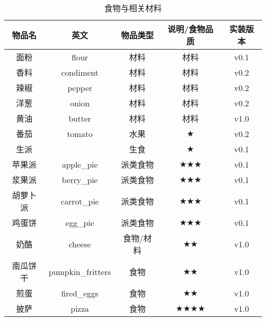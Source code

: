 \begin{table}[H]
    \centering
    \caption{食物与相关材料}
    \setlength{\tabcolsep}{4mm}
    \begin{tabular}{c|cccc}
        \toprule
        \textbf{物品名} & 英文              & \textbf{物品类型} & \textbf{说明/食物品质}                & \textbf{实装版本} \\
        \midrule
        面粉            & flour             & 材料            & 材料   & v0.1              \\
        香料            & condiment         & 材料            & 材料  & v0.2    \\
        辣椒            & pepper            & 材料            & 材料  & v0.2    \\
        洋葱            & onion             & 材料            & 材料  & v0.2    \\
        黄油            & butter            & 材料            & 材料  & v1.0    \\
        \midrule
        番茄            & tomato            & 水果            & $\bigstar$ & v0.2 \\
        \midrule
        生派            &                   & 生食              & $\bigstar$                            & v0.1              \\
        苹果派          & apple\_pie        & 派类食物           & $\bigstar \bigstar \bigstar$         & v0.1              \\
        浆果派          & berry\_pie        & 派类食物           & $\bigstar \bigstar \bigstar$         & v0.1              \\
        胡萝卜派        & carrot\_pie       & 派类食物           & $\bigstar \bigstar \bigstar$         & v0.1              \\
        鸡蛋饼          & egg\_pie       & 派类食物           & $\bigstar \bigstar \bigstar$         & v0.1              \\
        \midrule
        奶酪            & cheese            & 食物/材料         & $\bigstar \bigstar$                  & v1.0               \\
        南瓜饼干        & pumpkin\_fritters & 食物              & $\bigstar \bigstar$                   & v1.0              \\
        煎蛋            & fired\_eggs       & 食物              & $\bigstar \bigstar$                & v1.0              \\
        \midrule
        披萨            & pizza             & 食物              & $\bigstar \bigstar \bigstar \bigstar$ & v1.0              \\
        \bottomrule
    \end{tabular}
\end{table}

